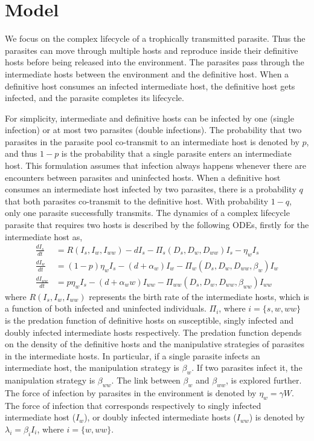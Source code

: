 \documentclass{article}
\begin{document}
\section{Model}
We focus on the complex lifecycle of a trophically transmitted parasite. 
Thus the parasites can move through multiple hosts and reproduce inside their definitive hosts before being released into the environment. 
The parasites pass through the intermediate hosts between the environment and the definitive host.
When a definitive host consumes an infected intermediate host, the definitive host gets infected, and the parasite completes its lifecycle.

For simplicity, intermediate and definitive hosts can be infected by one (single infection) or at most two parasites (double infections). 
The probability that two parasites in the parasite pool co-transmit to an intermediate host is denoted by  $p$, and thus $1-p$ is the probability that a single parasite enters an intermediate host. 
This formulation assumes that infection always happens whenever there are encounters between parasites and uninfected hosts.
When a definitive host consumes an intermediate host infected by two parasites, there is a probability $q$ that both parasites co-transmit to the definitive host.
With probability $1-q$, only one parasite successfully transmits. 
The dynamics of a complex lifecycle parasite that requires two hosts is described by the following ODEs, firstly for the intermediate host as,
%
\begin{align}
\frac{dI_s}{dt} &= R(I_s, I_w, I_{ww}) - d I_s - \Pi_s(D_s, D_w, D_{ww}) I_s  - \eta_w  I_s \nonumber \\ 
\frac{dI_w}{dt} &=  (1 - p) \eta_w I_s  - (d + \alpha_w) I_w - \Pi_w(D_s, D_w, D_{ww}, \beta_w) I_w \label{odes:ihosts} \\
\frac{dI_{ww}}{dt} &= p \eta_w I_s  - (d + \alpha_ww) I_{ww} - \Pi_{ww}(D_s, D_w, D_{ww}, \beta_{ww}) I_{ww} \nonumber
\end{align}
%
where $R(I_s, I_w, I_{ww})$ represents the birth rate of the intermediate hosts, which is a function of both infected and uninfected individuals. 
$\Pi_i$, where $i = \{s, w, ww\}$ is the predation function of definitive hosts on susceptible, singly infected and doubly infected intermediate hosts respectively. 
The predation function depends on the density of the definitive hosts and the manipulative strategies of parasites in the intermediate hosts. 
In particular, if a single parasite infects an intermediate host, the manipulation strategy is $\beta_w$. 
If two parasites infect it, the manipulation strategy is $\beta_{ww}$. 
The link between $\beta_w$ and $\beta_{ww}$, is explored further. 
The force of infection by parasites in the environment is denoted by $\eta_w = \gamma W$. 
The force of infection that corresponds respectively to singly infected intermediate host ($I_w$), or doubly infected intermediate hosts ($I_{ww}$) is denoted by $\lambda_i = \beta_i I_i$, where $i = \{ w, ww\}$. 
\end{document}
